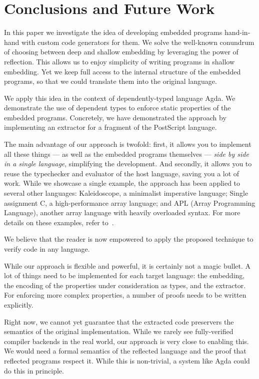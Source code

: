 \documentclass[sigplan,screen]{acmart}
\renewcommand\paragraph{\noindentparagraph}
\begin{document}
\section{Conclusions and Future Work} \label{sec:conclusion}


In this paper we investigate the idea of developing
embedded programs hand-in-hand with custom
code generators for them. We solve the well-known
conundrum of choosing between deep and shallow
embedding by leveraging the power of
reflection.
This allows us to enjoy simplicity of writing programs
in shallow embedding.  Yet we keep full access to the internal
structure of the embedded programs, so that we could translate
them into the original language.

We apply this idea in the context of dependently-typed
language Agda.  We demonstrate the use of dependent types
to enforce static properties of the embedded programs.
Concretely, we have demonstrated the approach by implementing
an extractor for a fragment of the PostScript language.

The main advantage of our approach is twofold: first, it allows
you to implement all these things --- as well as the embedded programs
themselves --- \emph{side by side in a single language}, simplifying
the development. And secondly, it allows you to reuse the typechecker
and evaluator of the host language, saving you a lot of work.
While we showcase a single example, the approach has been applied
to several other languages: Kaleidoscope, a minimalist imperative language;
Single assignment C, a high-performance array language; and
APL (Array Programming Language), another array language with
heavily overloaded syntax.
For more details on these examples,
refer to~\citet{DBLP:journals/corr/abs-2105-10819}.

We believe that the reader is now empowered to apply the proposed
technique to verify code in any language.



\paragraph{Future work}
While our approach is flexible and powerful, it is
certainly not a magic bullet. A lot of things
need to be implemented for each target language: the embedding,
the encoding of the properties under consideration as types,
and the extractor.  For enforcing more complex properties, a number
of proofs needs to be written explicitly.

Right now, we cannot yet guarantee that the
extracted code preservers the semantics of the original
implementation. While we rarely see
fully-verified compiler backends in the real world,
our approach is very close to enabling this.
We would need a formal semantics of the reflected language
and the proof that reflected programs respect it.
While this is non-trivial, a system like Agda could do
this in principle.
\end{document}
